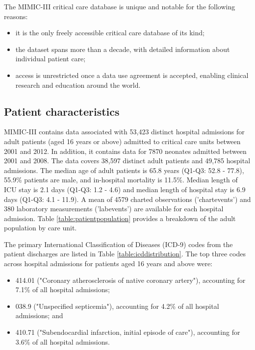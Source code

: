 \documentclass[english]{article}
\begin{document}
The MIMIC-III critical care database is unique and notable for the following reasons:
\begin{itemize}
  \item it is the only freely accessible critical care database of its kind;
  \item the dataset spans more than a decade, with detailed information about individual patient care;
  \item access is unrestricted once a data use agreement is accepted, enabling clinical research and education around the world.
\end{itemize}

\subsection*{Patient characteristics}

MIMIC-III contains data associated with 53,423 distinct hospital admissions for adult patients (aged 16 years or above) admitted to critical care units between 2001 and 2012. In addition, it contains data for 7870 neonates admitted between 2001 and 2008. The data covers 38,597 distinct adult patients and 49,785 hospital admissions. The median age of adult patients is 65.8 years (Q1-Q3: 52.8 - 77.8), 55.9\% patients are male, and in-hospital mortality is 11.5\%. Median length of ICU stay is 2.1 days (Q1-Q3: 1.2 - 4.6) and median length of hospital stay is 6.9 days (Q1-Q3: 4.1 - 11.9). A mean of 4579 charted observations ('chartevents') and 380 laboratory measurements ('labevents') are available for each hospital admission. Table \ref{table:patientpopulation} provides a breakdown of the adult population by care unit.

The primary International Classification of Diseases (ICD-9) codes from the patient discharges are listed in Table \ref{table:icddistribution}. The top three codes across hospital admissions for patients aged 16 years and above were:
\begin{itemize}
\item 414.01 ("Coronary atherosclerosis of native coronary artery"), accounting for 7.1\% of all hospital admissions;
\item 038.9 ("Unspecified septicemia"), accounting for 4.2\% of all hospital admissions; and
\item 410.71 ("Subendocardial infarction, initial episode of care"), accounting for 3.6\% of all hospital admissions.
\end{itemize}
\end{document}
